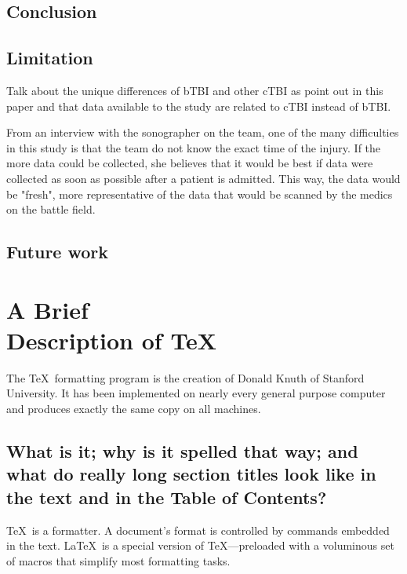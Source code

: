 \documentclass [11pt, proquest] {uwthesis}[2020/02/24]
\begin{document}
\section{Conclusion}



\section{Limitation}
Talk about the unique differences of bTBI and other cTBI as point out in this 
paper \cite{explosive} and that data available to the study are related to 
cTBI instead of bTBI.

From an interview with the sonographer on the team, one of the many difficulties in this
study is that the team do not know the exact time of the injury. If the more data could be
collected, she believes that it would be best if data were collected as soon as possible after
a patient is admitted. This way, the data would be "fresh", more representative of the data that
would be scanned by the medics on the battle field.


\section{Future work}


 
 
 
\chapter{A Brief \\ Description of \protect\TeX}
 
The \TeX\ formatting program is the creation of
Donald Knuth of Stanford University.
It has been implemented on nearly every general purpose computer and
produces exactly the same copy on all machines.
 
\section{What is it; why is it spelled that way; 
and what do
really long section titles look like in the text and in the
Table of Contents?}
 
\TeX\ is a formatter.  A document's format is controlled
by commands embedded in the text.  
\LaTeX\ is a special version of \TeX---preloaded
with a voluminous set of macros that simplify most
formatting tasks.
 
\end{document}
